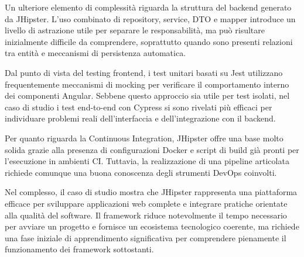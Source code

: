 Un ulteriore elemento di complessità riguarda la struttura del backend generato da JHipster. L’uso combinato di repository, service, DTO e mapper introduce un livello di astrazione utile per separare le responsabilità, ma può risultare inizialmente difficile da comprendere, soprattutto quando sono presenti relazioni tra entità e meccanismi di persistenza automatica.

Dal punto di vista del testing frontend, i test unitari basati su Jest utilizzano frequentemente meccanismi di mocking per verificare il comportamento interno dei componenti Angular. Sebbene questo approccio sia utile per test isolati, nel caso di studio i test end-to-end con Cypress si sono rivelati più efficaci per individuare problemi reali dell’interfaccia e dell’integrazione con il backend.

Per quanto riguarda la Continuous Integration, JHipster offre una base molto solida grazie alla presenza di configurazioni Docker e script di build già pronti per l’esecuzione in ambienti CI. Tuttavia, la realizzazione di una pipeline articolata richiede comunque una buona conoscenza degli strumenti DevOps coinvolti.

Nel complesso, il caso di studio mostra che JHipster rappresenta una piattaforma efficace per sviluppare applicazioni web complete e integrare pratiche orientate alla qualità del software. Il framework riduce notevolmente il tempo necessario per avviare un progetto e fornisce un ecosistema tecnologico coerente, ma richiede una fase iniziale di apprendimento significativa per comprendere pienamente il funzionamento dei framework sottostanti.

